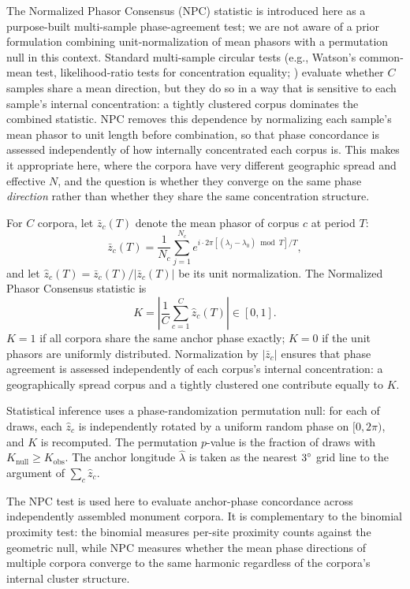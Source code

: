 \documentclass[12pt,a4paper]{article}
\newcommand{\degr}{\ifmmode^\circ\else\textdegree{}\fi}
\begin{document}
The Normalized Phasor Consensus (NPC) statistic is introduced here as
a purpose-built multi-sample phase-agreement test; we are not aware of
a prior formulation combining unit-normalization of mean phasors with a
permutation null in this context. Standard
multi-sample circular tests (e.g., Watson's common-mean test,
likelihood-ratio tests for concentration equality; \citealt{mardia2000directional})
evaluate whether $C$ samples share a mean direction, but they do so in a
way that is sensitive to each sample's internal concentration: a
tightly clustered corpus dominates the combined statistic. NPC removes
this dependence by normalizing each sample's mean phasor to unit length
before combination, so that phase concordance is assessed independently
of how internally concentrated each corpus is. This makes it appropriate
here, where the corpora have very different geographic spread and
effective $N$, and the question is whether they converge on the same
phase \emph{direction} rather than whether they share the same
concentration structure.

For $C$ corpora, let $\bar{z}_c(T)$ denote the mean phasor of
corpus $c$ at period $T$:
\[
\bar{z}_c(T) = \frac{1}{N_c}\sum_{j=1}^{N_c} e^{i \cdot 2\pi\left[(\lambda_j - \lambda_0) \bmod T\right] / T},
\]
and let $\hat{z}_c(T) = \bar{z}_c(T)/|\bar{z}_c(T)|$ be its unit
normalization. The Normalized Phasor Consensus statistic is
\[
K = \left|\frac{1}{C}\sum_{c=1}^{C}\hat{z}_c(T)\right| \in [0, 1].
\]
$K = 1$ if all corpora share the same anchor phase exactly; $K = 0$
if the unit phasors are uniformly distributed. Normalization by
$|\bar{z}_c|$ ensures that phase agreement is assessed independently
of each corpus's internal concentration: a geographically spread
corpus and a tightly clustered one contribute equally to $K$.

Statistical inference uses a phase-randomization permutation null:
for each of \simNperms{} draws, each $\hat{z}_c$ is independently
rotated by a uniform random phase on $[0, 2\pi)$, and $K$ is
recomputed. The permutation $p$-value is the fraction of draws with
$K_\mathrm{null} \geq K_\mathrm{obs}$. The anchor longitude
$\hat{\lambda}$ is taken as the nearest $3\degr$ grid line to the
argument of $\sum_c \hat{z}_c$.

The NPC test is used here to evaluate anchor-phase concordance
across independently assembled monument corpora. It is complementary
to the binomial proximity test: the binomial measures per-site
proximity counts against the geometric null, while NPC measures
whether the mean phase directions of multiple corpora converge to the
same harmonic regardless of the corpora's internal cluster structure.
\end{document}
